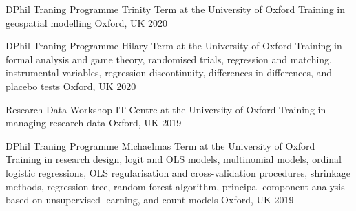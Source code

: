 





\vspace{1mm}

\begin{cvhonors}
\cvhonor
{DPhil Traning Programme Trinity Term at the University of Oxford} 
{Training in geospatial modelling} 
{Oxford, UK}
{2020}
\end{cvhonors}

\vspace{1mm}

\begin{cvhonors}
\cvhonor
{DPhil Traning Programme Hilary Term at the University of Oxford} 
{Training in formal analysis and game theory, randomised trials, regression and matching, instrumental variables, regression discontinuity, differences-in-differences, and placebo tests} 
{Oxford, UK}
{2020}
\end{cvhonors}

\vspace{1mm}

\begin{cvhonors}
\cvhonor
{Research Data Workshop IT Centre at the University of Oxford} 
{Training in managing research data} 
{Oxford, UK}
{2019}
\end{cvhonors}

\vspace{1mm}

\begin{cvhonors}
\cvhonor
{DPhil Traning Programme Michaelmas Term at the University of Oxford}
{Training in research design, logit and OLS models, multinomial models, ordinal logistic regressions,  OLS regularisation and cross-validation procedures, shrinkage methods, regression tree, random forest algorithm, principal component analysis based on unsupervised learning, and count models}
{Oxford, UK}
{2019}
\end{cvhonors}

